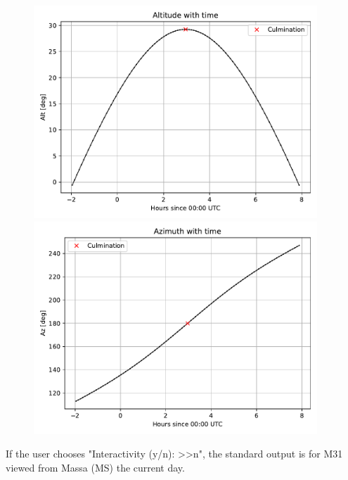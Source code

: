 \documentclass[a4paper]{article}
\begin{document}
		\begin{figure}[h!]
			\centering
			\begin{minipage}{0.48\textwidth}
				\centering
				\includegraphics[width=0.95\textwidth]{Alt.pdf}
			\end{minipage}\hfill
			\begin{minipage}{0.48\textwidth}
				\centering
				\includegraphics[width=0.95\textwidth]{Az.pdf}
			\end{minipage}
		\end{figure}
	
		If the user chooses "Interactivity (y/n): >>n", the standard output is for M31 viewed from Massa (MS) the current day.

		
\end{document}
